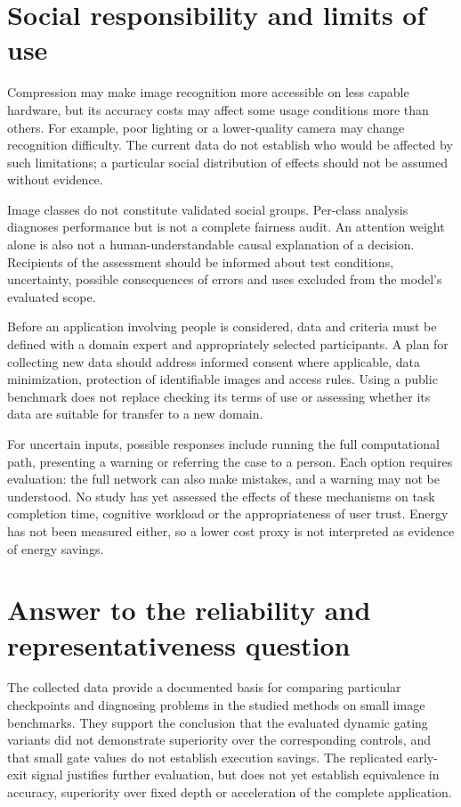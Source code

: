 \documentclass[12pt,a4paper]{article}
\begin{document}
\section{Social responsibility and limits of use}

Compression may make image recognition more accessible on less capable
hardware, but its accuracy costs may affect some usage conditions
more than others.
For example, poor lighting or a lower-quality camera may change
recognition difficulty.
The current data do not establish who would be affected by such
limitations; a particular social distribution of effects should not
be assumed without evidence.

Image classes do not constitute validated social groups.
Per-class analysis diagnoses performance but is not a complete fairness
audit. An attention weight alone is also not a human-understandable
causal explanation of a decision.
Recipients of the assessment should be informed about test conditions,
uncertainty, possible consequences of errors and uses excluded
from the model's evaluated scope.

Before an application involving people is considered, data and criteria
must be defined with a domain expert and appropriately selected
participants.
A plan for collecting new data should address informed consent where
applicable, data minimization, protection of identifiable images
and access rules.
Using a public benchmark does not replace checking its terms of use
or assessing whether its data are suitable for transfer to a new domain.

For uncertain inputs, possible responses include running the full
computational path, presenting a warning or referring the case to
a person. Each option requires evaluation: the full network can also
make mistakes, and a warning may not be understood.
No study has yet assessed the effects of these mechanisms on task
completion time, cognitive workload or the appropriateness of user trust.
Energy has not been measured either, so a lower cost proxy is not
interpreted as evidence of energy savings.

\section{Answer to the reliability and representativeness question}

The collected data provide a documented basis for comparing particular
checkpoints and diagnosing problems in the studied methods on small
image benchmarks.
They support the conclusion that the evaluated dynamic gating variants
did not demonstrate superiority over the corresponding controls,
and that small gate values do not establish execution savings.
The replicated early-exit signal justifies further evaluation,
but does not yet establish equivalence in accuracy, superiority
over fixed depth or acceleration of the complete application.
\end{document}
